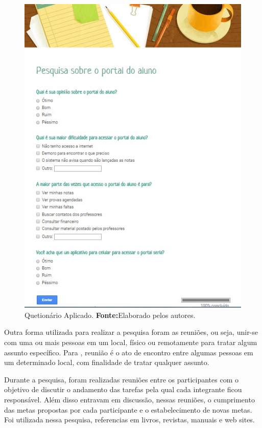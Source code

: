 \begin{figure}[h!]
	\centerline{\includegraphics[scale=0.5]{./imagens/imagem4.png}}
	\caption[Quetionário Aplicado]{Quetionário Aplicado.
	 \textbf{Fonte:}Elaborado pelos autores.}
	\label{fig:exemplo4}
\end{figure}

\pagebreak

	\par Outra forma utilizada para realizar a pesquisa foram as reuniões, ou seja,
unir-se com uma ou mais pessoas em um local, físico ou remotamente para tratar
algum assunto específico. Para , reunião é o ato
de encontro entre algumas pessoas em um determinado local, com finalidade de tratar
qualquer assunto.

	\par Durante a pesquisa, foram realizadas reuniões entre os participantes com o
objetivo de discutir o andamento das tarefas pela qual cada integrante ficou
responsável. Além disso entravam em discussão, nessas reuniões, o cumprimento
das metas propostas por cada participante e o estabelecimento de novas metas.
Foi utilizada nessa pesquisa, referencias em livros, revistas, manuais e web
sites.


